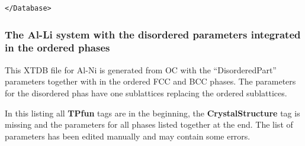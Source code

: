 \documentclass{article}
\begin{document}
\begin{appendices}
\begin{verbatim}
</Database>
\end{verbatim}

\subsubsection{The Al-Li system with the disordered parameters
  integrated in the ordered phases}\label{sec:alli2}

This XTDB file for Al-Ni is generated from OC with the
``DisorderedPart'' parameters together with in the ordered FCC and BCC
phases.  The parameters for the disordered phas have one sublattices
replacing the ordered sublattices.

In this listing all {\bf TPfun} tags are in the beginning, the {\bf
  CrystalStructure} tag is missing and the parameters for all phases
listed together at the end.  The list of parameters has been edited
manually and may contain some errors.


\end{appendices}
\end{document}
